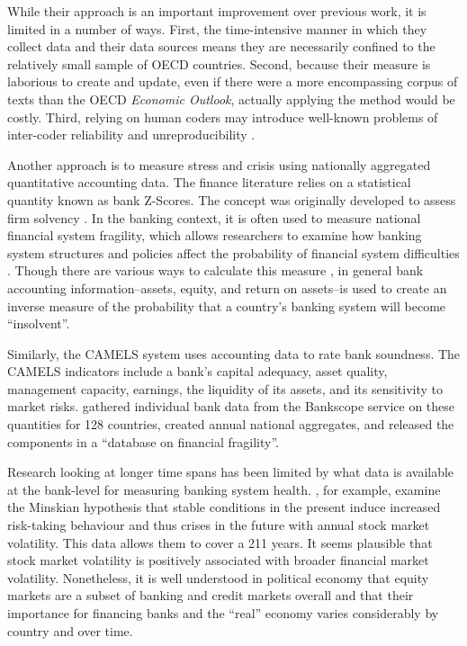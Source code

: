 \documentclass[]{article}
\begin{document}
While their approach is an important improvement over previous work, it is limited in a number of ways. First, the time-intensive manner in which they collect data and their data sources means they are necessarily confined to the relatively small sample of OECD countries. Second, because their measure is laborious to create and update, even if there were a more encompassing corpus of texts than the OECD \emph{Economic Outlook}, actually applying the method would be costly. Third, relying on human coders may introduce well-known problems of inter-coder reliability and unreproducibility \citep{Minhas2015}.

Another approach is to measure stress and crisis using nationally aggregated quantitative accounting data. The finance literature relies on a statistical quantity known as bank Z-Scores. The concept was originally developed to assess firm solvency \citep[see][]{roy1952}. In the banking context, it is often used to measure national financial system fragility, which allows researchers to examine how banking system structures and policies affect the probability of financial system difficulties \citep[e.g.][]{beck2013bank,vcihak2010islamic,laeven2009bank,uhde2009}. Though there are various ways to calculate this measure \citep[73]{Lepetit2013}, in general bank accounting information--assets, equity, and return on assets--is used to create an inverse measure of the probability that a country's banking system will become ``insolvent''.

Similarly, the CAMELS system uses accounting data to rate bank soundness. The CAMELS indicators include a bank's capital adequacy, asset quality, management capacity, earnings, the liquidity of its assets, and its sensitivity to market risks. \cite{Andrianova2015} gathered individual bank data from the Bankscope service on these quantities for 128 countries, created annual national aggregates, and released the components in a ``database on financial fragility''.

Research looking at longer time spans has been limited by what data is available at the bank-level for measuring banking system health. \cite{Danielsson2015}, for example, examine the Minskian \citeyearpar{Minsky1982} hypothesis that stable conditions in the present induce increased risk-taking behaviour and thus crises in the future with annual stock market volatility. This data allows them to cover a 211 years. It seems plausible that stock market volatility is positively associated with broader financial market volatility. Nonetheless, it is well understood in political economy \citep[seminally][]{hall2001introduction} that equity markets are a subset of banking and credit markets overall and that their importance for financing banks and the ``real'' economy varies considerably by country and over time.
\end{document}
